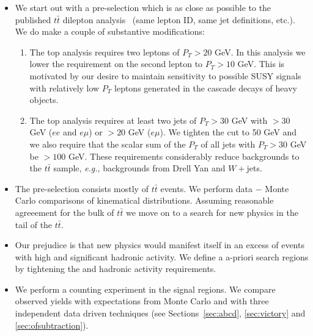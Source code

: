 \begin{itemize}

\item We start out with a pre-selection which is as close as 
possible to the published $t\bar{t}$
dilepton analysis~\cite{ref:top} (same lepton ID, same jet definitions,
etc.).  We do make a couple of substantive modifications:

\begin{enumerate}
\item The top analysis requires two leptons of $P_T > 20$ GeV.  
 In this
analysis we lower the requirement on the second lepton to $P_T > 10$ 
GeV.  This is motivated by our desire to maintain sensitivity to possible
SUSY signals with relatively low $P_T$ leptons generated in the 
cascade decays of heavy objects.
\item The top analysis requires at least two jets of $P_T > 30$
GeV with \met $>30$ GeV ($ee$ and $e\mu$) or \met $>20$ GeV ($e \mu$).
We tighten the \met cut to 50 GeV and we 
also require that the scalar sum of the $P_T$ of all jets with $P_T > 30$
GeV be $> 100$ GeV.  These requirements considerably
reduce backgrounds to the $t\bar{t}$ sample, {\em e.g.}, backgrounds
from Drell Yan and $W+$jets.
\end{enumerate}

\item The pre-selection consists mostly of $t\bar{t}$ events.  We perform 
data $-$ Monte Carlo comparisons of kinematical distributions.  Assuming
reasonable agreeement for the bulk of $t\bar{t}$ we move on to a 
search for new physics in the tail of the $t\bar{t}$.

\item Our prejudice is that new physics would manifest itself in an
excess of events with high \met and significant hadronic activity.
We define a a-priori search regions by tightening the \met and 
hadronic activity requirements.

\item We perform a counting experiment in the signal regions.  We compare
observed yields with expectations from Monte Carlo and with three independent
data driven techniques (see Sections~\ref{sec:abcd}, \ref{sec:victory} and \ref{sec:ofsubtraction}).

\end{itemize}



